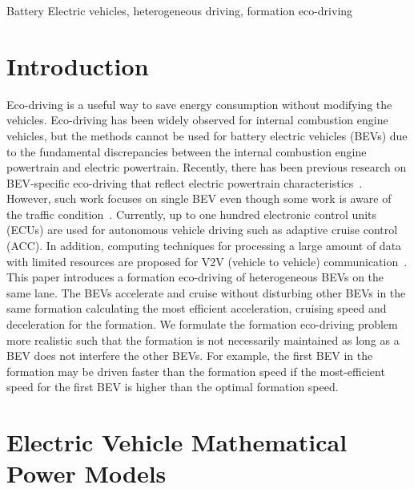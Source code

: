 \documentclass{IEEEtran}
\begin{document}
\begin{IEEEkeywords}
Battery Electric vehicles, heterogeneous driving, formation eco-driving
\end{IEEEkeywords}



\section{Introduction}

Eco-driving is a useful way to save energy consumption without modifying the vehicles.
Eco-driving has been widely observed for internal combustion engine vehicles, but the methods cannot be used for battery electric vehicles (BEVs) due to the fundamental discrepancies between the internal combustion engine powertrain and electric powertrain.
Recently, there has been previous research on BEV-specific eco-driving that reflect electric powertrain characteristics~\cite{Lin:ICCA14, Wu:ITS15, Dib:IVPPC11}. However, such work focuses on single BEV even though some work is aware of the traffic condition~\cite{Yan:NAPS14, Dib:CEP14, Wu:ITS15}. 
Currently, up to one hundred electronic control units (ECUs) are used for autonomous vehicle driving such as adaptive cruise control (ACC). In addition, computing techniques for processing a large amount of data with limited resources are proposed for V2V (vehicle to vehicle) communication~\cite{Shreejith:ESL13}.
This paper introduces a formation eco-driving of heterogeneous BEVs on the same lane. The BEVs accelerate and cruise without disturbing other BEVs in the same formation calculating the most efficient acceleration, cruising speed and deceleration for the formation. 
We formulate the formation eco-driving problem more realistic such that the formation is not necessarily maintained as long as a BEV does not interfere the other BEVs. For example, the first BEV in the formation may be driven faster than the formation speed if the most-efficient speed for the first BEV is higher than the optimal formation speed. 


\section{Electric Vehicle Mathematical Power Models}
\end{document}
